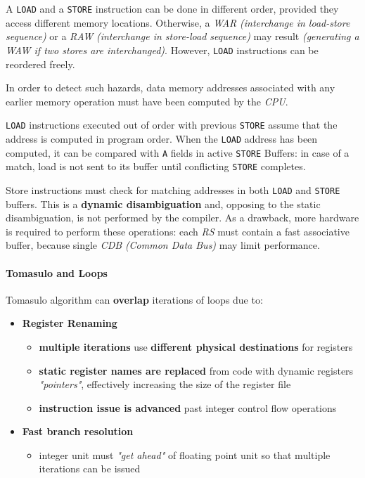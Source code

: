\documentclass[english]{article}
\begin{document}
\bigskip
A \texttt{LOAD} and a \texttt{STORE} instruction can be done in different order, provided they access different memory locations.
Otherwise, a \textit{WAR} \textit{(interchange in load-store sequence)} or a \textit{RAW} \textit{(interchange in store-load sequence)} may result \textit{(generating a \textit{WAW} if two stores are interchanged)}.
However, \texttt{LOAD} instructions can be reordered freely.

In order to detect such hazards, data memory addresses associated with any earlier memory operation must have been computed by the \textit{CPU}.

\bigskip
\texttt{LOAD} instructions executed out of order with previous \texttt{STORE} assume that the address is computed in program order.
When the \texttt{LOAD} address has been computed, it can be compared with \texttt{A} fields in active \texttt{STORE} Buffers: in case of a match, load is not sent to its buffer until conflicting \texttt{STORE} completes.

Store instructions must check for matching addresses in both \texttt{LOAD} and \texttt{STORE} buffers.
This is a \textbf{dynamic disambiguation} and, opposing to the static disambiguation, is not performed by the compiler.
As a drawback, more hardware is required to perform these operations: each \textit{RS} must contain a fast associative buffer, because single \textit{CDB} \textit{(Common Data Bus)}  may limit performance.

\paragraph{Tomasulo and Loops}

Tomasulo algorithm can \textbf{overlap} iterations of loops due to:

\begin{itemize}
  \item \textbf{Register Renaming}
        \begin{itemize}
          \item \textbf{multiple iterations} use \textbf{different physical destinations} for registers
          \item \textbf{static register names are replaced} from code with dynamic registers \textit{"pointers"}, effectively increasing the size of the register file
          \item \textbf{instruction issue is advanced} past integer control flow operations
        \end{itemize}
  \item \textbf{Fast branch resolution}
        \begin{itemize}
          \item integer unit must \textit{"get ahead"} of floating point unit so that multiple iterations can be issued
        \end{itemize}
\end{itemize}
\end{document}

